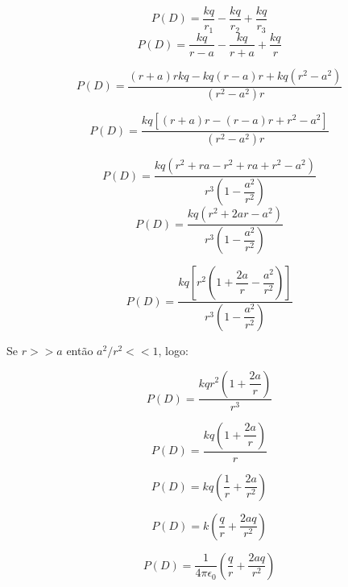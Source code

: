 \documentclass[a4paper, 12pt]{article}
\begin{document}
	\[
	P(D)=\frac{kq}{r_1}-\frac{kq}{r_2}+\frac{kq}{r_3}\]
	\[
	P(D)=\frac{kq}{r-a}-\frac{kq}{r+a}+\frac{kq}{r}\]
	
	
	\[
	P(D)=\frac{(r+a)rkq-kq(r-a)r+kq(r^2-a^2)}{(r^2-a^2)r}\]
	
	\[
	P(D)=\frac{kq\left[(r+a)r-(r-a)r+r^2-a^2\right]}{(r^2-a^2)r}\]
	
	\[
	P(D)=\frac{kq\left(r^2+ra-r^2+ra+r^2-a^2\right)}{r^3\left(1-\dfrac{a^2}{r^2}\right)}\]
	\[
	P(D)=\frac{kq\left(r^2+2ar-a^2\right)}{r^3\left(1-\dfrac{a^2}{r^2}\right)}\]
	
	\[
	P(D)=\frac{kq\left[r^2\left(1+\dfrac{2a}{r}-\dfrac{a^2}{r^2}\right)\right]}{r^3\left(1-\dfrac{a^2}{r^2}\right)}\]
	
	Se $r>>a$ então $a^2/r^2<<1$, logo:
	
	\[
	P(D)=\frac{kqr^2\left(1+\dfrac{2a}{r}\right)}{r^3}\]
	
	\[
	P(D)=\frac{kq\left(1+\dfrac{2a}{r}\right)}{r}\]
	
	\[
	P(D)=kq\left(\dfrac{1}{r}+\dfrac{2a}{r^2}\right)\]
	
	\[
	P(D)=k\left(\dfrac{q}{r}+\dfrac{2aq}{r^2}\right)\]
	
	\[
	P(D)=\dfrac{1}{4\pi\epsilon_0}\left(\dfrac{q}{r}+\dfrac{2aq}{r^2}\right)\]
	
\end{document}
